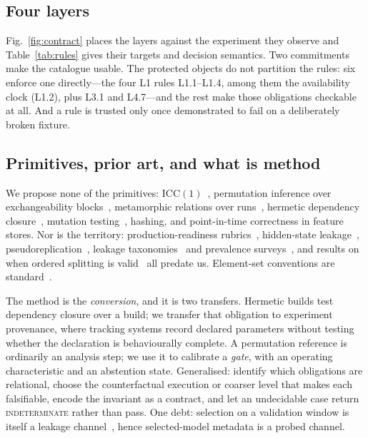 \documentclass[conference]{IEEEtran}
\newcommand{\rulename}[1]{\textsf{#1}}
\begin{document}
\subsection{Four layers}

Fig.~\ref{fig:contract} places the layers against the experiment they observe and
Table~\ref{tab:rules} gives their targets and decision semantics. Two commitments make the
catalogue usable. The protected objects do not partition the rules: six enforce one
directly---the four \rulename{L1} rules \rulename{L1.1}--\rulename{L1.4}, among them the
availability clock (\rulename{L1.2}), plus \rulename{L3.1} and \rulename{L4.7}---and the rest make
those obligations checkable at all. And a rule is trusted only once demonstrated to fail on a
deliberately broken fixture.

\subsection{Primitives, prior art, and what is method}

We propose none of the primitives: $\mathrm{ICC}(1)$~\cite{shrout1979icc}, permutation inference
over exchangeability blocks~\cite{winkler2014permutation}, metamorphic relations over
runs~\cite{chen2018metamorphic}, hermetic dependency closure~\cite{mokhov2018buildsystems},
mutation testing~\cite{jia2011mutation}, hashing, and point-in-time correctness in feature stores.
Nor is the territory: production-readiness
rubrics~\cite{breck2017mltestscore}, hidden-state leakage~\cite{sculley2015debt},
pseudoreplication~\cite{hurlbert1984pseudoreplication}, leakage taxonomies~\cite{kaufman2012leakage}
and prevalence surveys~\cite{kapoor2023leakage}, and results on when ordered splitting is
valid~\cite{bergmeir2012crossval} all predate us. Element-set conventions are
standard~\cite{vallado2006revisiting}.

The method is the \emph{conversion}, and it is two transfers. Hermetic builds test dependency
closure over a build; we transfer that obligation to experiment provenance, where tracking systems
record declared parameters without testing whether the declaration is behaviourally complete. A
permutation reference is ordinarily an analysis step; we use it to calibrate a \emph{gate}, with an
operating characteristic and an abstention state. Generalised: identify which obligations are
relational, choose the counterfactual execution or coarser level that makes each falsifiable, encode
the invariant as a contract, and let an undecidable case return \textsc{indeterminate} rather than
pass. One debt: selection on a validation window is itself a leakage
channel~\cite{cawley2010selection}, hence selected-model metadata is a probed channel.
\end{document}
